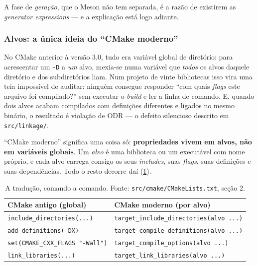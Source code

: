 A fase de \emph{geração}, que o Meson não tem separada, é a razão de existirem
as \emph{generator expressions} --- e a explicação está logo adiante.

\subsubsection{Alvos: a única ideia do ``CMake moderno''}

\begin{porque}
No CMake anterior à versão 3.0, tudo era variável global de diretório: para
acrescentar um \texttt{-D} a \emph{um} alvo, mexia-se numa variável que
\emph{todos} os alvos daquele diretório e dos subdiretórios liam. Num projeto
de vinte bibliotecas isso vira uma teia impossível de auditar: ninguém consegue
responder ``com quais \emph{flags} este arquivo foi compilado?'' sem executar o
\emph{build} e ler a linha de comando. E, quando dois alvos acabam compilados
com definições diferentes e ligados no mesmo binário, o resultado é violação de
ODR --- o defeito silencioso descrito em \texttt{src/linkage/}.
\end{porque}

``CMake moderno'' significa uma coisa só: \textbf{propriedades vivem em alvos,
não em variáveis globais}. Um \emph{alvo} é uma biblioteca ou um executável
com nome próprio, e cada alvo carrega consigo os seus \emph{includes}, suas
\emph{flags}, suas definições e suas dependências. Todo o resto decorre daí
(\cref{tab:cmake-antigo-moderno}).

\begin{table}[htbp]
\centering
\caption{A tradução, comando a comando. Fonte: \texttt{src/cmake/CMakeLists.txt},
         seção 2.}
\label{tab:cmake-antigo-moderno}
\footnotesize
\begin{tabular}{@{}ll@{}}
\toprule
\textbf{CMake antigo (global)} & \textbf{CMake moderno (por alvo)} \\
\midrule
\texttt{include\_directories(...)}        & \texttt{target\_include\_directories(alvo ...)} \\
\texttt{add\_definitions(-DX)}            & \texttt{target\_compile\_definitions(alvo ...)} \\
\texttt{set(CMAKE\_CXX\_FLAGS "-Wall")}   & \texttt{target\_compile\_options(alvo ...)} \\
\texttt{link\_libraries(...)}             & \texttt{target\_link\_libraries(alvo ...)} \\
\bottomrule
\end{tabular}
\end{table}

